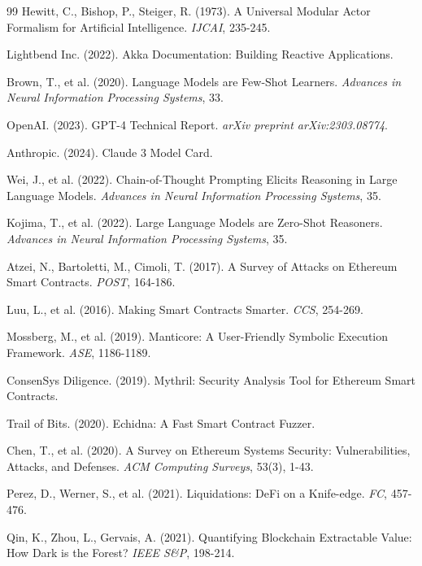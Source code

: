 \documentclass[12pt,a4paper,twoside]{book}
\begin{document}
\begin{thebibliography}{99}
Hewitt, C., Bishop, P., Steiger, R. (1973).
A Universal Modular Actor Formalism for Artificial Intelligence.
\textit{IJCAI}, 235-245.

Lightbend Inc. (2022).
Akka Documentation: Building Reactive Applications.

Brown, T., et al. (2020).
Language Models are Few-Shot Learners.
\textit{Advances in Neural Information Processing Systems}, 33.

OpenAI. (2023).
GPT-4 Technical Report.
\textit{arXiv preprint arXiv:2303.08774}.

Anthropic. (2024).
Claude 3 Model Card.

Wei, J., et al. (2022).
Chain-of-Thought Prompting Elicits Reasoning in Large Language Models.
\textit{Advances in Neural Information Processing Systems}, 35.

Kojima, T., et al. (2022).
Large Language Models are Zero-Shot Reasoners.
\textit{Advances in Neural Information Processing Systems}, 35.

Atzei, N., Bartoletti, M., Cimoli, T. (2017).
A Survey of Attacks on Ethereum Smart Contracts.
\textit{POST}, 164-186.

Luu, L., et al. (2016).
Making Smart Contracts Smarter.
\textit{CCS}, 254-269.

Mossberg, M., et al. (2019).
Manticore: A User-Friendly Symbolic Execution Framework.
\textit{ASE}, 1186-1189.

ConsenSys Diligence. (2019).
Mythril: Security Analysis Tool for Ethereum Smart Contracts.

Trail of Bits. (2020).
Echidna: A Fast Smart Contract Fuzzer.

Chen, T., et al. (2020).
A Survey on Ethereum Systems Security: Vulnerabilities, Attacks, and Defenses.
\textit{ACM Computing Surveys}, 53(3), 1-43.

Perez, D., Werner, S., et al. (2021).
Liquidations: DeFi on a Knife-edge.
\textit{FC}, 457-476.

Qin, K., Zhou, L., Gervais, A. (2021).
Quantifying Blockchain Extractable Value: How Dark is the Forest?
\textit{IEEE S\&P}, 198-214.


\end{thebibliography}
\end{document}
